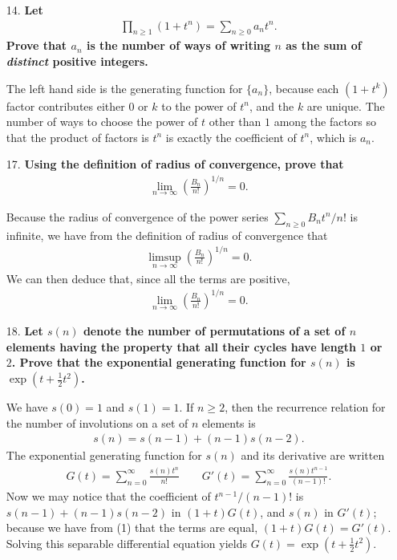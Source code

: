 \documentclass[a4paper,12pt]{article}
\begin{document}
\begin{enumerate}
    \item[14.]
        \boldmath
        \textbf{Let
        \begin{align*}
            \prod_{n \geq 1} (1 + t^n) = \sum_{n \geq 0} a_n t^n.
        \end{align*}
        Prove that $a_n$ is the number of ways of writing $n$ as the sum of \textit{distinct} positive integers.} \par
        \unboldmath
        The left hand side is the generating function for $\{ a_n \}$, because each $(1 + t^k)$ factor contributes either $0$ or $k$ to the power of $t^n$, and the $k$ are unique. The number of ways to choose the power of $t$ other than $1$ among the factors so that the product of factors is $t^n$ is exactly the coefficient of $t^n$, which is $a_n$.

    \item[17.]
        \boldmath
        \textbf{Using the definition of radius of convergence, prove that
        \begin{align*}
            \lim_{n \to \infty} \left( \frac{B_n}{n!} \right)^{1/n} = 0.
        \end{align*}
        } \par
        \unboldmath
        Because the radius of convergence of the power series $\sum_{n \geq 0} B_n t^n / n!$ is infinite, we have from the definition of radius of convergence that
        \begin{align*}
            \limsup_{n \to \infty} \left( \frac{B_n}{n!} \right)^{1/n} = 0.
        \end{align*}
        We can then deduce that, since all the terms are positive,
        \begin{align*}
            \lim_{n \to \infty} \left( \frac{B_n}{n!} \right)^{1/n} = 0.
        \end{align*}

    \item[18.]
        \boldmath
        \textbf{Let $s(n)$ denote the number of permutations of a set of $n$ elements having the property that all their cycles have length $1$ or $2$. Prove that the exponential generating function for $s(n)$ is $\exp(t + \frac{1}{2} t^2)$.} \par
        \unboldmath
        We have $s(0) = 1$ and $s(1) = 1$. If $n \geq 2$, then the recurrence relation for the number of involutions on a set of $n$ elements is
        \begin{align}
            s(n) = s(n - 1) + (n - 1)s(n - 2).
        \end{align}
        The exponential generating function for $s(n)$ and its derivative are written
        \begin{align*}
            G(t) = \sum_{n = 0}^\infty \frac{s(n) t^n}{n!} \qquad G'(t) = \sum_{n = 0}^\infty \frac{s(n) t^{n - 1}}{(n - 1)!}.
        \end{align*}
        Now we may notice that the coefficient of $t^{n - 1}/(n - 1)!$ is $s(n - 1) + (n - 1) s(n - 2)$ in $(1 + t)G(t)$, and $s(n)$ in $G'(t)$; because we have from (1) that the terms are equal, $(1 + t)G(t) = G'(t)$. Solving this separable differential equation yields $G(t) = \exp(t + \frac{1}{2} t^2)$.
\end{enumerate}
\end{document}
